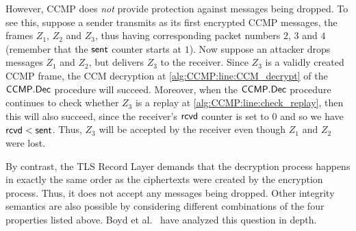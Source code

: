 However,
CCMP does \emph{not} provide protection against messages being dropped.
To see this,
suppose a sender transmits as its first encrypted CCMP messages,
the frames $Z_1$, $Z_2$ and $Z_3$,
thus having corresponding packet numbers $2$, $3$ and $4$
(remember that the $\mathsf{sent}$ counter starts at $1$).
Now suppose an attacker drops messages $Z_1$ and $Z_2$,
but delivers $Z_3$ to the receiver.
Since $Z_3$ is a validly created CCMP frame,
the CCM decryption at \cref{alg:CCMP:line:CCM_decrypt} of the $\mathsf{CCMP}.\mathsf{Dec}$ procedure  will succeed.
Moreover,
when the $\mathsf{CCMP}.\mathsf{Dec}$ procedure continues to check whether $Z_3$ is a replay at \cref{alg:CCMP:line:check_replay},
then this will also succeed,
since the receiver's $\mathsf{rcvd}$ counter is set to $0$ and so we have $\mathsf{rcvd} < \mathsf{sent}$.
Thus,
$Z_3$ will be accepted by the receiver even though $Z_1$ and $Z_2$ were lost.





By contrast,
the TLS Record Layer demands that the decryption process happens in exactly the same order as the ciphertexts were created by the encryption process.
Thus,
it does not accept any messages being dropped.
Other integrity semantics are also possible by considering different combinations of the four properties listed above.
Boyd et al.~\cite{RSA:BHMS16} have analyzed this question in depth.
 

